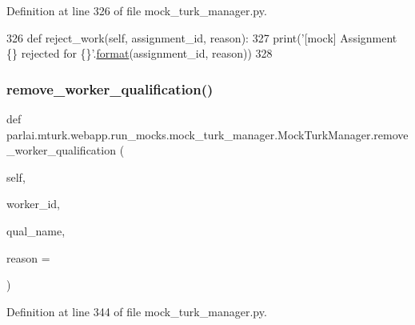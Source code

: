 Definition at line 326 of file mock\+\_\+turk\+\_\+manager.\+py.


\begin{DoxyCode}
326     \textcolor{keyword}{def }reject\_work(self, assignment\_id, reason):
327         print(\textcolor{stringliteral}{'[mock] Assignment \{\} rejected for \{\}'}.\hyperlink{namespaceparlai_1_1chat__service_1_1services_1_1messenger_1_1shared__utils_a32e2e2022b824fbaf80c747160b52a76}{format}(assignment\_id, reason))
328 
\end{DoxyCode}
\mbox{\label{classparlai_1_1mturk_1_1webapp_1_1run__mocks_1_1mock__turk__manager_1_1MockTurkManager_ac70157931deafc3b0369897dec105041}} 
\subsubsection{\texorpdfstring{remove\+\_\+worker\+\_\+qualification()}{remove\_worker\_qualification()}}
{\footnotesize\ttfamily def parlai.\+mturk.\+webapp.\+run\+\_\+mocks.\+mock\+\_\+turk\+\_\+manager.\+Mock\+Turk\+Manager.\+remove\+\_\+worker\+\_\+qualification (\begin{DoxyParamCaption}\item[{}]{self,  }\item[{}]{worker\+\_\+id,  }\item[{}]{qual\+\_\+name,  }\item[{}]{reason = {\ttfamily \textquotesingle{}\textquotesingle{}} }\end{DoxyParamCaption})}



Definition at line 344 of file mock\+\_\+turk\+\_\+manager.\+py.


